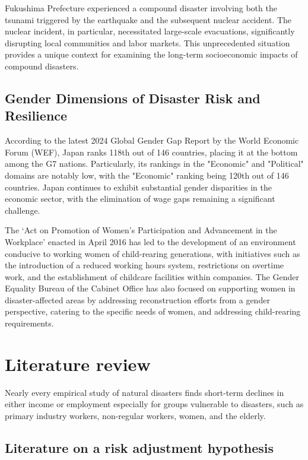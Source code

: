 \documentclass[12pt,halfline,a4paper]{ouparticle}
\begin{document}
Fukushima Prefecture experienced a compound disaster involving both the tsunami triggered by the earthquake and the subsequent nuclear accident. The nuclear incident, in particular, necessitated large-scale evacuations, significantly disrupting local communities and labor markets. This unprecedented situation provides a unique context for examining the long-term socioeconomic impacts of compound disasters.

\subsection{Gender Dimensions of Disaster Risk and Resilience}
\label{sec5.1}

According to the latest 2024 Global Gender Gap Report by the World Economic Forum (WEF), Japan ranks 118th out of 146 countries, placing it at the bottom among the G7 nations. Particularly, its rankings in the "Economic" and "Political" domains are notably low, with the "Economic" ranking being 120th out of 146 countries. Japan continues to exhibit substantial gender disparities in the economic sector, with the elimination of wage gaps remaining a significant challenge.

The ‘Act on Promotion of Women’s Participation and Advancement in the Workplace’ enacted in April 2016 has led to the development of an environment conducive to working women of child-rearing generations, with initiatives such as the introduction of a reduced working hours system, restrictions on overtime work, and the establishment of childcare facilities within companies. The Gender Equality Bureau of the Cabinet Office has also focused on supporting women in disaster-affected areas by addressing reconstruction efforts from a gender perspective, catering to the specific needs of women, and addressing child-rearing requirements.


\section{Literature review}
\label{sec3}

Nearly every empirical study of natural disasters finds short-term declines in either income or employment especially for groups vulnerable to disasters, such as primary industry workers, non-regular workers, women, and the elderly. 

\subsection{Literature on a risk adjustment hypothesis}
\label{sec5.1}
\end{document}

